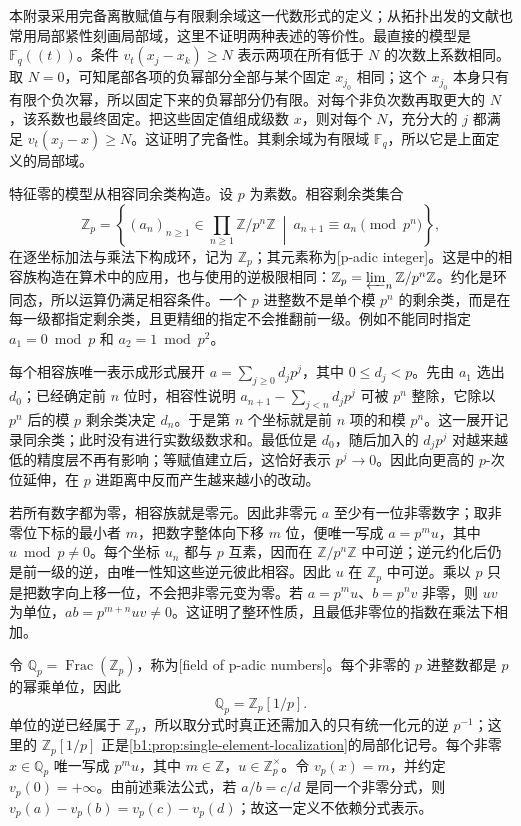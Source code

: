 本附录采用完备离散赋值与有限剩余域这一代数形式的定义；从拓扑出发的文献也常用局部紧性刻画局部域，这里不证明两种表述的等价性。最直接的模型是 \(\mathbb F_q(\!(t)\!)\)。条件 \(v_t(x_j-x_k)\geq N\) 表示两项在所有低于 \(N\) 的次数上系数相同。取 \(N=0\)，可知尾部各项的负幂部分全部与某个固定 \(x_{j_0}\) 相同；这个 \(x_{j_0}\) 本身只有有限个负次幂，所以固定下来的负幂部分仍有限。对每个非负次数再取更大的 \(N\)，该系数也最终固定。把这些固定值组成级数 \(x\)，则对每个 \(N\)，充分大的 \(j\) 都满足 \(v_t(x_j-x)\geq N\)。这证明了完备性。其剩余域为有限域 \(\mathbb F_q\)，所以它是上面定义的局部域。

\ProseParagraphBreak
特征零的模型从相容同余类构造。设 \(p\) 为素数。相容剩余类集合
\[
	\mathbb Z_p=\left\{(a_n)_{n\geq1}\in\prod_{n\geq1}\mathbb Z/p^n\mathbb Z \ \middle|\ a_{n+1}\equiv a_n\pmod {p^n}\right\},
\]
在逐坐标加法与乘法下构成环，记为 \(\mathbb Z_p\)；其元素称为[p-adic integer]。这是中的相容族构造在算术中的应用，也与使用的逆极限相同：\(\mathbb Z_p=\varprojlim_n\mathbb Z/p^n\mathbb Z\)。约化是环同态，所以运算仍满足相容条件。一个 \(p\) 进整数不是单个模 \(p^n\) 的剩余类，而是在每一级都指定剩余类，且更精细的指定不会推翻前一级。例如不能同时指定 \(a_1=0\bmod p\) 和 \(a_2=1\bmod p^2\)。

\ProseParagraphBreak
每个相容族唯一表示成形式展开 \(a=\sum_{j\geq0}d_jp^j\)，其中 \(0\leq d_j<p\)。先由 \(a_1\) 选出 \(d_0\)；已经确定前 \(n\) 位时，相容性说明 \(a_{n+1}-\sum_{j<n}d_jp^j\) 可被 \(p^n\) 整除，它除以 \(p^n\) 后的模 \(p\) 剩余类决定 \(d_n\)。于是第 \(n\) 个坐标就是前 \(n\) 项的和模 \(p^n\)。这一展开记录同余类；此时没有进行实数级数求和。最低位是 \(d_0\)，随后加入的 \(d_jp^j\) 对越来越低的精度层不再有影响；等赋值建立后，这恰好表示 \(p^j\to0\)。因此向更高的 \(p\)-次位延伸，在 \(p\) 进距离中反而产生越来越小的改动。

\ProseParagraphBreak
若所有数字都为零，相容族就是零元。因此非零元 \(a\) 至少有一位非零数字；取非零位下标的最小者 \(m\)，把数字整体向下移 \(m\) 位，便唯一写成 \(a=p^mu\)，其中 \(u\bmod p\neq0\)。每个坐标 \(u_n\) 都与 \(p\) 互素，因而在 \(\mathbb Z/p^n\mathbb Z\) 中可逆；逆元约化后仍是前一级的逆，由唯一性知这些逆元彼此相容。因此 \(u\) 在 \(\mathbb Z_p\) 中可逆。乘以 \(p\) 只是把数字向上移一位，不会把非零元变为零。若 \(a=p^mu\)、\(b=p^nv\) 非零，则 \(uv\) 为单位，\(ab=p^{m+n}uv\neq0\)。这证明了整环性质，且最低非零位的指数在乘法下相加。

\ProseParagraphBreak
令 \(\mathbb Q_p=\operatorname{Frac}(\mathbb Z_p)\)，称为[field of p-adic numbers]。每个非零的 \(p\) 进整数都是 \(p\) 的幂乘单位，因此
\[
	\mathbb Q_p=\mathbb Z_p[1/p].
\]
单位的逆已经属于 \(\mathbb Z_p\)，所以取分式时真正还需加入的只有统一化元的逆 \(p^{-1}\)；这里的 \(\mathbb Z_p[1/p]\) 正是\cref{b1:prop:single-element-localization}的局部化记号。每个非零 \(x\in\mathbb Q_p\) 唯一写成 \(p^mu\)，其中 \(m\in\mathbb Z\)，\(u\in\mathbb Z_p^\times\)。令 \(v_p(x)=m\)，并约定 \(v_p(0)=+\infty\)。由前述乘法公式，若 \(a/b=c/d\) 是同一个非零分式，则 \(v_p(a)-v_p(b)=v_p(c)-v_p(d)\)；故这一定义不依赖分式表示。

